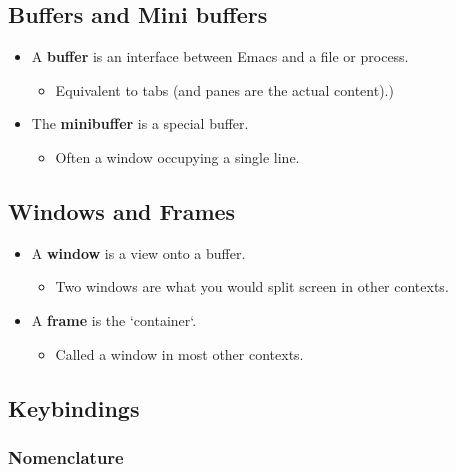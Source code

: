 \documentclass[11pt]{article}
\begin{document}
\subsection{Buffers and Mini buffers}
\label{sec:org1384051}

\begin{itemize}
\item A \textbf{buffer} is an interface between Emacs and a file or process.

\begin{itemize}
\item Equivalent to tabs (and panes are the actual content).)
\end{itemize}

\item The \textbf{minibuffer} is a special buffer.

\begin{itemize}
\item Often a window occupying a single line.
\end{itemize}
\end{itemize}

\subsection{Windows and Frames}
\label{sec:org34044fb}

\begin{itemize}
\item A \textbf{window} is a view onto a buffer.

\begin{itemize}
\item Two windows are what you would split screen in other contexts.
\end{itemize}

\item A \textbf{frame} is the `container`.

\begin{itemize}
\item Called a window in most other contexts.
\end{itemize}
\end{itemize}

\subsection{Keybindings}
\label{sec:org6eb7b6d}

\subsubsection{Nomenclature}
\label{sec:org056559d}
\end{document}
